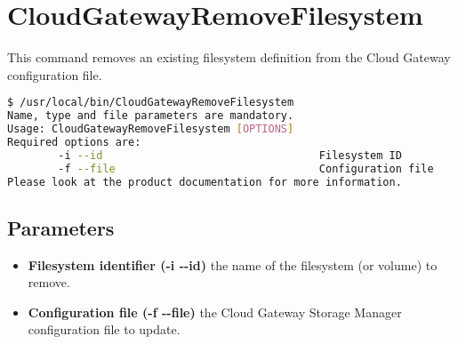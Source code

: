\documentclass[11pt,fleqn,openany]{book} %
\begin{document}
\clearpage


\section*{CloudGatewayRemoveFilesystem}
\label{sec:cloudgatewayremovefilesystem}

This command removes an existing filesystem definition from the Cloud Gateway configuration file.

\begin{lstlisting}[language=bash]
$ /usr/local/bin/CloudGatewayRemoveFilesystem
Name, type and file parameters are mandatory.
Usage: CloudGatewayRemoveFilesystem [OPTIONS]
Required options are:
        -i --id                                  Filesystem ID
        -f --file                                Configuration file
Please look at the product documentation for more information.
\end{lstlisting}

\subsection*{Parameters}

\begin{itemize}
\item \textbf{Filesystem identifier (-i -{}-id)} the name of the filesystem (or volume) to remove.

\item \textbf{Configuration file (-f -{}-file)} the Cloud Gateway Storage Manager configuration file to update.

\end{itemize}
\end{document}
